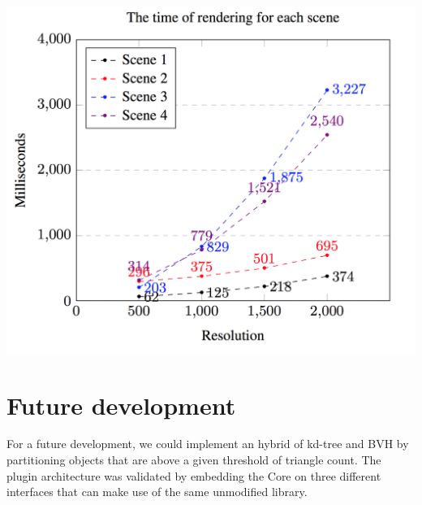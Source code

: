 \documentclass[a0,portrait]{a0poster}
\begin{document}
\begin{multicols}{2}
\begin{center}\vspace{1cm}
\includegraphics[width=0.8\linewidth]{results_rendered}
\end{center}\vspace{1cm}



\section*{Future development}

For a future development, we could implement an hybrid of kd-tree and
BVH by partitioning objects that are above a given threshold of
triangle count. The plugin architecture was validated by embedding the
Core on three different interfaces that can make use of the same
unmodified library.



\end{multicols}
\end{document}
